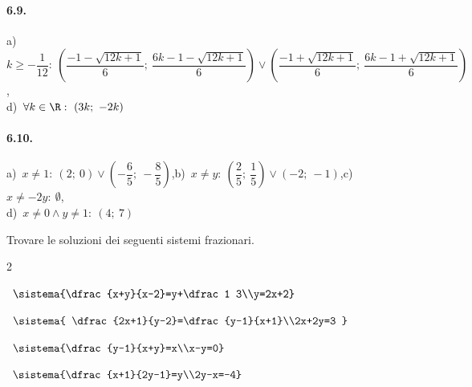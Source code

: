 \paragraph{6.9.} a)~\(k\ge -\dfrac 1{12}:~\left(\dfrac{-1-\sqrt{12k+1}} 
6;~ 
\dfrac{6k-1-\sqrt{12k+1}} 6\right) \vee \left(\dfrac{-1+\sqrt{12k+1}} 6;~ 
\dfrac{6k-1+\sqrt{12k+1}} 6\right)\),\protect\\
\quad d)~\(\forall k\in \R:~(3k;~ -2k)\)

\paragraph{6.10.} a)~\(x\neq 1:~\left(2;~0\right)\vee \left(-\dfrac 6 
5;~-\dfrac 8 
5\right)\),\quad b)~\(x\neq y:~\left(\dfrac 2 5;~\dfrac 1 5\right)\vee 
\left(-2;~-1\right)\),\quad c)~\(x\neq -2y:~\emptyset\),\protect\\
\quad d)~\(x\neq 0\wedge y\neq 1:~(4;~7)\)

\begin{esercizio}[*]
\label{ese:6.11}
Trovare le soluzioni dei seguenti sistemi frazionari.
\begin{htmulticols}{2}
\begin{enumeratea}
\item~\(\sistema{\dfrac{x+y}{x-2}=y+\dfrac 1 
3\\y=2x+2}\)

\item~\(\sistema{
\dfrac{2x+1}{y-2}=\dfrac{y-1}{x+1}\\2x+2y=3
}\)


\item~\(\sistema{\dfrac{y-1}{x+y}=x\\x-y=0}\)

\item~\(\sistema{\dfrac{x+1}{2y-1}=y\\2y-x=-4}\)
\end{enumeratea}
\end{htmulticols}
\end{esercizio}

